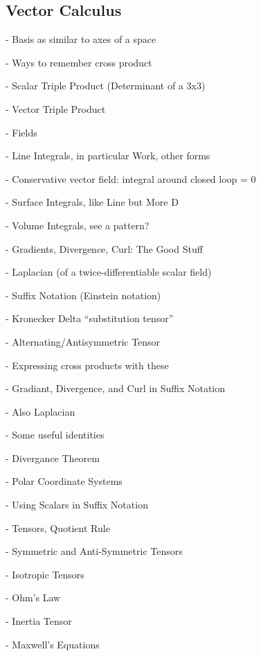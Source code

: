 \begin{center}\section{Vector Calculus}\end{center}

- Basis as similar to axes of a space

- Ways to remember cross product

- Scalar Triple Product (Determinant of a 3x3)

- Vector Triple Product

- Fields

- Line Integrals, in particular Work, other forms

- Conservative vector field: integral around closed loop = 0

- Surface Integrals, like Line but More D

- Volume Integrals, see a pattern?

- Gradients, Divergence, Curl: The Good Stuff

- Laplacian (of a twice-differentiable scalar field)

- Suffix Notation (Einstein notation)

- Kronecker Delta ``substitution tensor''

- Alternating/Antisymmetric Tensor

- Expressing cross products with these

- Gradiant, Divergence, and Curl in Suffix Notation

- Also Laplacian

- Some useful identities

- Divergance Theorem

- Polar Coordinate Systems

- Using Scalars in Suffix Notation

- Tensors, Quotient Rule

- Symmetric and Anti-Symmetric Tensors

- Isotropic Tensors

- Ohm's Law

- Inertia Tensor

- Maxwell's Equations

